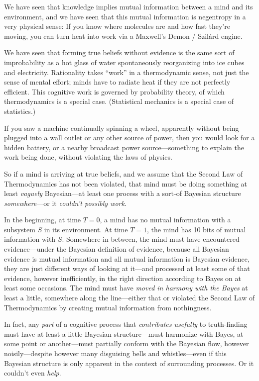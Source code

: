 {
 We have seen that knowledge implies mutual information between a
mind and its environment, and we have seen that this mutual information
is negentropy in a very physical sense: If you know where molecules are
and how fast they're moving, you can turn heat into
work via a Maxwell's Demon / Szilárd engine.}

{
 We have seen that forming true beliefs without evidence is the
same sort of improbability as a hot glass of water spontaneously
reorganizing into ice cubes and electricity. Rationality takes
``work'' in a thermodynamic sense,
not just the sense of mental effort; minds have to radiate heat if they
are not perfectly efficient. This cognitive work is governed by
probability theory, of which thermodynamics is a special case.
(Statistical mechanics is a special case of statistics.)}

{
 If you saw a machine continually spinning a wheel, apparently
without being plugged into a wall outlet or any other source of power,
then you would look for a hidden battery, or a nearby broadcast power
source---something to explain the work being done, without violating
the laws of physics.}

{
 So if a mind is arriving at true beliefs, and we assume that the
Second Law of Thermodynamics has not been violated, that mind must be
doing something at least \textit{vaguely} Bayesian---at least one
process with a sort-of Bayesian structure \textit{somewhere}{}---or it
\textit{couldn't possibly work}.}

{
 In the beginning, at time $T = 0$, a mind has no mutual information
with a subsystem $S$ in its environment. At time $T = 1$, the mind has 10
bits of mutual information with $S$. Somewhere in between, the mind must
have encountered evidence---under the Bayesian definition of evidence,
because all Bayesian evidence is mutual information and all mutual
information is Bayesian evidence, they are just different ways of
looking at it---and processed at least some of that evidence, however
inefficiently, in the right direction according to Bayes on at least
some occasions. The mind must have \textit{moved in harmony with the
Bayes} at least a little, somewhere along the line---either that or
violated the Second Law of Thermodynamics by creating mutual
information from nothingness.}

{
 In fact, any \textit{part} of a cognitive process that
\textit{contributes usefully} to truth-finding must have at least a
little Bayesian structure---must harmonize with Bayes, at some point or
another---must partially conform with the Bayesian flow, however
noisily---despite however many disguising bells and whistles---even if
this Bayesian structure is only apparent in the context of surrounding
processes. Or it couldn't even \textit{help}.}

